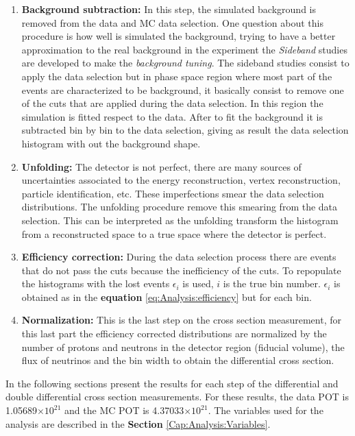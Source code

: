 \begin{enumerate}
    \item \textbf{Background subtraction:} In this step, the simulated background is removed from the data and MC data selection. One question about this procedure is how well is simulated the background, trying to have a better approximation to the real background in the experiment the \textit{Sideband} studies are developed to make the \textit{background tuning}. The sideband studies consist to apply the data selection but in phase space region where most part of the events are characterized to be background, it basically consist to remove one of the cuts that are applied during the data selection. In this region the simulation is fitted respect to the data. After to fit the background it is subtracted bin by bin to the data selection, giving as result the data selection histogram with out the background shape. 

    \item \textbf{Unfolding:} The detector is not perfect, there are many sources of uncertainties associated to the energy reconstruction, vertex reconstruction, particle identification, etc. These imperfections smear the data selection distributions. The unfolding procedure remove this smearing from the data selection. This can be interpreted as the unfolding transform the histogram from a reconstructed space to a true space where the detector is perfect. 

    \item \textbf{Efficiency correction:} During the data selection process there are events that do not pass the cuts because the inefficiency of the cuts. To repopulate the histograms with the lost events $\epsilon_i$ is used, $i$ is the true bin number. $\epsilon_i$ is obtained as in the \textbf{equation} \ref{eq:Analysis:efficiency} but for each bin. 

    \item \textbf{Normalization:} This is the last step on the cross section measurement, for this last part the efficiency corrected distributions are normalized by the number of protons and neutrons in the detector region (fiducial volume), the flux of neutrinos and the bin width to obtain the differential cross section. 
    
\end{enumerate}

    In the following sections present the results for each step of the differential and double differential cross section measurements. For these results, the data POT is 1.05689$\times 10^{21}$ and the MC POT is 4.37033$\times 10^{21}$.  The variables used for the analysis are described in the \textbf{Section} \ref{Cap:Analysis:Variables}.


